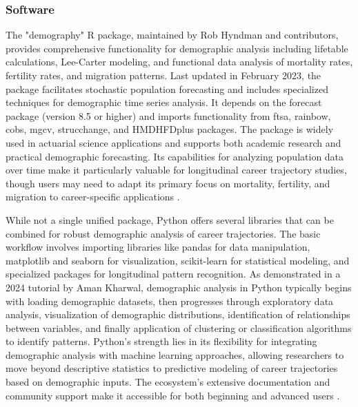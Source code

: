 \documentclass[../main.tex]{subfiles}
\begin{document}
\subsubsection{Software}


The "demography" R package, maintained by Rob Hyndman and contributors, provides comprehensive functionality for demographic analysis including lifetable calculations, Lee-Carter modeling, and functional data analysis of mortality rates, fertility rates, and migration patterns. Last updated in February 2023, the package facilitates stochastic population forecasting and includes specialized techniques for demographic time series analysis. It depends on the forecast package (version 8.5 or higher) and imports functionality from ftsa, rainbow, cobs, mgcv, strucchange, and HMDHFDplus packages. The package is widely used in actuarial science applications and supports both academic research and practical demographic forecasting. Its capabilities for analyzing population data over time make it particularly valuable for longitudinal career trajectory studies, though users may need to adapt its primary focus on mortality, fertility, and migration to career-specific applications \parencite{hyndman2023demography}.


While not a single unified package, Python offers several libraries that can be combined for robust demographic analysis of career trajectories. The basic workflow involves importing libraries like pandas for data manipulation, matplotlib and seaborn for visualization, scikit-learn for statistical modeling, and specialized packages for longitudinal pattern recognition. As demonstrated in a 2024 tutorial by Aman Kharwal, demographic analysis in Python typically begins with loading demographic datasets, then progresses through exploratory data analysis, visualization of demographic distributions, identification of relationships between variables, and finally application of clustering or classification algorithms to identify patterns. Python's strength lies in its flexibility for integrating demographic analysis with machine learning approaches, allowing researchers to move beyond descriptive statistics to predictive modeling of career trajectories based on demographic inputs. The ecosystem's extensive documentation and community support make it accessible for both beginning and advanced users \parencite{kharwal2024demographics}.
\end{document}

